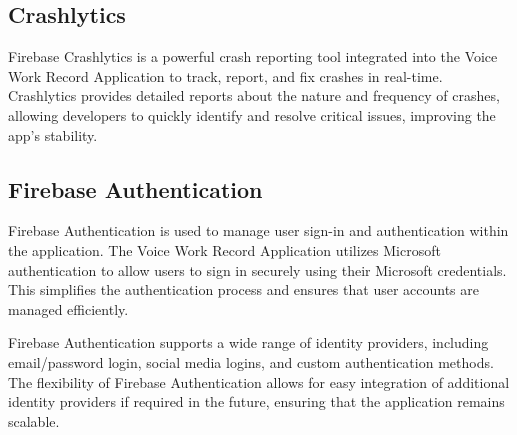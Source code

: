 \documentclass[
  digital,     %
  oneside,     %
  nosansbold,  %
  nocolorbold, %
  lof,         %
  lot,         %
]{fithesis4}
\begin{document}
\subsection{Crashlytics}

Firebase Crashlytics is a powerful crash reporting tool integrated into the Voice Work Record Application to track, report, and fix crashes in real-time. Crashlytics provides detailed reports about the nature and frequency of crashes, allowing developers to quickly identify and resolve critical issues, improving the app's stability.

\subsection{Firebase Authentication}

Firebase Authentication is used to manage user sign-in and authentication within the application. The Voice Work Record Application utilizes Microsoft authentication to allow users to sign in securely using their Microsoft credentials. This simplifies the authentication process and ensures that user accounts are managed efficiently.

Firebase Authentication supports a wide range of identity providers, including email/password login, social media logins, and custom authentication methods. The flexibility of Firebase Authentication allows for easy integration of additional identity providers if required in the future, ensuring that the application remains scalable.

\shorthandoff{-}
\begin{markdown}
\end{markdown}
\shorthandon{-}
\end{document}
